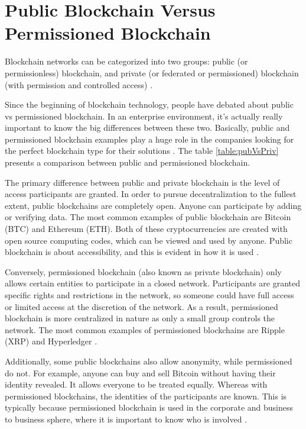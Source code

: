 \section{Public Blockchain Versus Permissioned Blockchain}\label{sec:versus}

Blockchain networks can be categorized into two groups: public (or permissionless) blockchain, and private (or federated or permissioned) blockchain (with permission and controlled access) \cite{greve2018blockchain}.

Since the beginning of blockchain technology, people have debated about public vs permissioned blockchain. In an enterprise environment, it’s actually really important to know the big differences between these two. Basically, public and permissioned blockchain examples play a huge role in the companies looking for the perfect blockchain type for their solutions \cite{101blockchains}. The table \ref{table:pubVsPriv} presents a comparison between public and permissioned blockchain.

The primary difference between public and private blockchain is the level of access participants are granted. In order to pursue decentralization to the fullest extent, public blockchains are completely open. Anyone can participate by adding or verifying data. The most common examples of public blockchain are Bitcoin (BTC) and Ethereum (ETH). Both of these cryptocurrencies are created with open source computing codes, which can be viewed and used by anyone. Public blockchain is about accessibility, and this is evident in how it is used \cite{selfkeyOrg}. 

Conversely, permissioned blockchain (also known as private blockchain) only allows certain entities to participate in a closed network. Participants are granted specific rights and restrictions in the network, so someone could have full access or limited access at the discretion of the network. As a result, permissioned blockchain is more centralized in nature as only a small group controls the network. The most common examples of permissioned blockchains are Ripple (XRP) and Hyperledger \cite{blockgeeks2018deeper}.

Additionally, some public blockchains also allow anonymity, while permissioned do not. For example, anyone can buy and sell Bitcoin without having their identity revealed. It allows everyone to be treated equally. Whereas with permissioned blockchains, the identities of the participants are known. This is typically because permissioned blockchain is used in the corporate and business to business sphere, where it is important to know who is involved \cite{101blockchains}.

